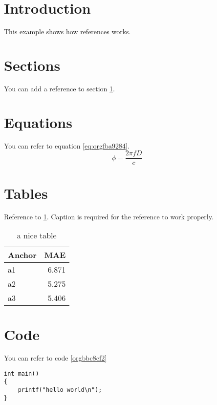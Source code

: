 


\section{Introduction}
\label{sec:orgce31e36}
This example shows how references works.

\section{Sections}
\label{sec:org0374f44}
You can add a reference to section \ref{sec:orgce31e36}.

\section{Equations}
\label{sec:orgb6c90d3}
You can refer to equation \ref{eq:orgfba9284}.
\begin{equation}
\label{eq:orgfba9284}
\phi = \frac{2\pi fD}{c}
\end{equation}

\section{Tables}
\label{sec:org7303f93}
Reference to \ref{tab:org4ed2da1}.
Caption is required for the reference to work properly.

\begin{table}[htbp]
\caption{\label{tab:org4ed2da1}
a nice table}
\centering
\begin{tabular}{lr}
Anchor & MAE\\
\hline
a1 & 6.871\\
a2 & 5.275\\
a3 & 5.406\\
\end{tabular}
\end{table}

\section{Code}
\label{sec:orgebf15c3}
You can refer to code \ref{orgbbc8cf2}

\begin{verbatim}
int main()
{
    printf("hello world\n");
}
\end{verbatim}


